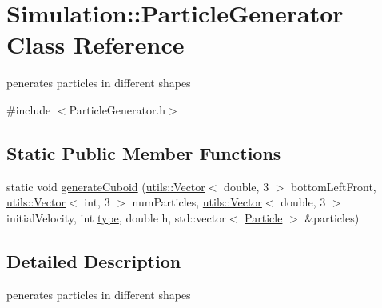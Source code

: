 \hypertarget{classSimulation_1_1ParticleGenerator}{\section{Simulation\-:\-:Particle\-Generator Class Reference}
\label{classSimulation_1_1ParticleGenerator}
}


penerates particles in different shapes  




{\ttfamily \#include $<$Particle\-Generator.\-h$>$}

\subsection*{Static Public Member Functions}
\begin{DoxyCompactItemize}
\item 
static void \hyperlink{classSimulation_1_1ParticleGenerator_aa4b339a3676975dcd51e3b7a345dd494}{generate\-Cuboid} (\hyperlink{classutils_1_1Vector}{utils\-::\-Vector}$<$ double, 3 $>$ bottom\-Left\-Front, \hyperlink{classutils_1_1Vector}{utils\-::\-Vector}$<$ int, 3 $>$ num\-Particles, \hyperlink{classutils_1_1Vector}{utils\-::\-Vector}$<$ double, 3 $>$ initial\-Velocity, int \hyperlink{classtype}{type}, double h, std\-::vector$<$ \hyperlink{classSimulation_1_1Particle}{Particle} $>$ \&particles)
\end{DoxyCompactItemize}


\subsection{Detailed Description}
penerates particles in different shapes 


